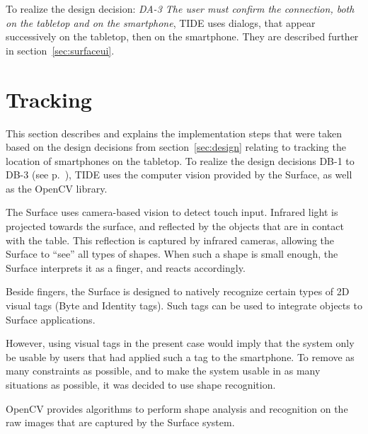 To realize the design decision:
\emph{DA-3 The user must confirm the connection, both on the tabletop and on the smartphone},
TIDE uses dialogs, that appear successively on the tabletop, then on the smartphone.
They are described further in section~\ref{sec:surfaceui}.

\section{Tracking}
\label{sec:tracking}

This section describes and explains the implementation steps that were taken based on the design decisions from section~\ref{sec:design} relating to tracking the location of smartphones on the tabletop.
To realize the design decisions DB-1 to DB-3 (see p.~\pageref{DB}), TIDE uses the computer vision provided by the Surface, as well as the OpenCV library.

The Surface uses camera-based vision to detect touch input.
Infrared light is projected towards the surface, and reflected by the objects that are in contact with the table.
This reflection is captured by infrared cameras, allowing the Surface to ``see'' all types of shapes.
When such a shape is small enough, the Surface interprets it as a finger, and reacts accordingly.

Beside fingers, the Surface is designed to natively recognize certain types of 2D visual tags (Byte and Identity tags).
Such tags can be used to integrate objects to Surface applications.

However, using visual tags in the present case would imply that the system only be usable by users that had applied such a tag to the smartphone.
To remove as many constraints as possible, and to make the system usable in as many situations as possible, it was decided to use shape recognition.

OpenCV provides algorithms to perform shape analysis and recognition on the raw images that are captured by the Surface system. 


